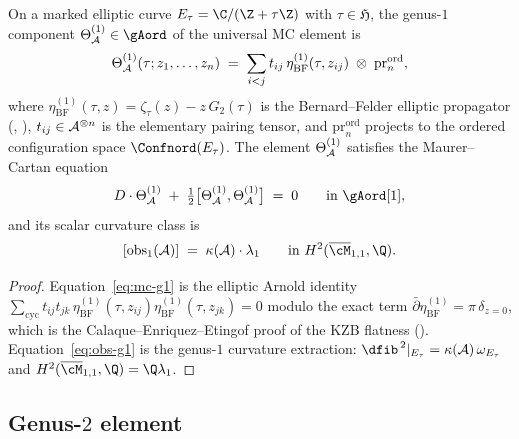 \begin{proposition}
\label{prop:theta-A-genus1}
On a marked elliptic curve $E_\tau=\C/(\Z+\tau\Z)$ with
$\tau\in\mathfrak{H}$, the genus-$1$ component
$\Theta_\cA^{(1)}\in\gAord$ of the universal MC element is
\begin{equation}\label{eq:theta-A-g1}
\Theta_{\mathcal{A}}^{(1)}(\tau;z_{1},\ldots,z_{n})
\;=\;
\sum_{i<j} t_{ij}\,\eta^{(1)}_{\mathrm{BF}}(\tau, z_{ij})
\;\otimes\; \mathrm{pr}_{n}^{\mathrm{ord}},
\end{equation}
where $\eta^{(1)}_{\mathrm{BF}}(\tau,z)=\zeta_{\tau}(z)-z\,G_{2}(\tau)$
is the Bernard--Felder elliptic propagator \textup{(}\cite{Bernard88},
\cite{CEE10}\textup{)}, $t_{ij}\in\mathcal{A}^{\otimes n}$ is the elementary
pairing tensor, and $\mathrm{pr}_{n}^{\mathrm{ord}}$ projects to the
ordered configuration space $\Confnord(E_\tau)$. The element
$\Theta_{\mathcal{A}}^{(1)}$ satisfies the Maurer--Cartan equation
\begin{equation}\label{eq:mc-g1}
D\cdot\Theta_\cA^{(1)}
\;+\;
\tfrac{1}{2}\bigl[\Theta_\cA^{(1)},\Theta_\cA^{(1)}\bigr] \;=\; 0
\qquad \textup{in } \gAord\textup{[}1\textup{]},
\end{equation}
and its scalar curvature class is
\begin{equation}\label{eq:obs-g1}
[\mathrm{obs}_{1}(\cA)]
\;=\;
\kscal(\cA)\cdot\lambda_{1}
\qquad \textup{in } H^{2}(\overline{\cM}_{1,1},\Q).
\end{equation}
\end{proposition}

\begin{proof}
Equation~\eqref{eq:mc-g1} is the elliptic Arnold identity
$\sum_{\mathrm{cyc}} t_{ij}t_{jk}\,\eta^{(1)}_{\mathrm{BF}}(\tau,z_{ij})
\eta^{(1)}_{\mathrm{BF}}(\tau,z_{jk})=0$ modulo the exact term
$\bar\partial \eta^{(1)}_{\mathrm{BF}}=\pi\,\delta_{z=0}$, which is the
Calaque--Enriquez--Etingof proof of the KZB flatness
\textup{(}\cite[Theorem~4.1]{CEE10}\textup{)}.
Equation~\eqref{eq:obs-g1} is the genus-$1$ curvature extraction:
$\dfib^{\,2}|_{E_\tau}=\kscal(\cA)\,\omega_{E_\tau}$
and $H^{2}(\overline{\cM}_{1,1},\Q)=\Q\lambda_{1}$. \end{proof}

\subsection{Genus-$2$ element}
\label{subsec:theta-A-g2}


